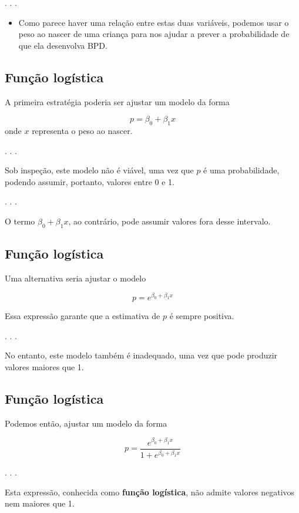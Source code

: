 \documentclass[
  letterpaper,
  DIV=11,
  numbers=noendperiod]{scrartcl}
\providecommand{\tightlist}{%
  \setlength{\itemsep}{0pt}\setlength{\parskip}{0pt}}\usepackage{longtable,booktabs,array}
\begin{document}
. . .

\begin{itemize}
\tightlist
\item
  Como parece haver uma relação entre estas duas variáveis, podemos usar
  o peso ao nascer de uma criança para nos ajudar a prever a
  probabilidade de que ela desenvolva BPD.
\end{itemize}

\subsection{Função logística}\label{funuxe7uxe3o-loguxedstica}

A primeira estratégia poderia ser ajustar um modelo da forma

\[p = \beta_0 + \beta_1 x\] onde \(x\) representa o peso ao nascer.

. . .

Sob inspeção, este modelo não é viável, uma vez que \(p\) é uma
probabilidade, podendo assumir, portanto, valores entre 0 e 1.

. . .

O termo \(\beta_0 + \beta_1 x\), ao contrário, pode assumir valores fora
desse intervalo.

\subsection{Função logística}\label{funuxe7uxe3o-loguxedstica-1}

Uma alternativa seria ajustar o modelo

\[p = e^{\beta_0 + \beta_1 x}\]

Essa expressão garante que a estimativa de \(p\) é sempre positiva.

. . .

No entanto, este modelo também é inadequado, uma vez que pode produzir
valores maiores que 1.

\subsection{Função logística}\label{funuxe7uxe3o-loguxedstica-2}

Podemos então, ajustar um modelo da forma

\[p = \dfrac{e^{\beta_0 + \beta_1 x}}{1 + e^{\beta_0 + \beta_1 x}}\]

. . .

Esta expressão, conhecida como \textbf{função logística}, não admite
valores negativos nem maiores que 1.
\end{document}
